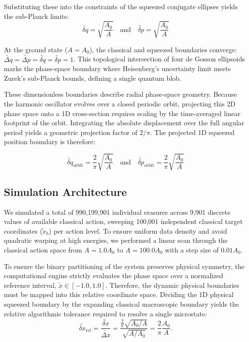 \documentclass[%
  aps, reprint, prl, amsmath,amssymb
]{revtex4-2}
\begin{document}
Substituting these into the constraints of the squeezed conjugate ellipses yields the sub-Planck limits:
\begin{equation}
\widetilde{\delta q} = \sqrt{\frac{A_0}{A}} \quad \text{and} \quad \widetilde{\delta p} = \sqrt{\frac{A_0}{A}}
\end{equation}

At the ground state ($A = A_0$), the classical and squeezed boundaries converge: $\widetilde{\Delta q} = \widetilde{\Delta p} = \widetilde{\delta q} = \widetilde{\delta p} = 1$. This topological intersection of four de Gosson ellipsoids marks the phase-space boundary where Heisenberg's uncertainty limit meets Zurek's sub-Planck bounds, defining a single quantum blob.

These dimensionless boundaries describe radial phase-space geometry. Because the harmonic oscillator evolves over a closed periodic orbit, projecting this 2D phase space onto a 1D cross-section requires scaling by the time-averaged linear footprint of the orbit. Integrating the absolute displacement over the full angular period yields a geometric projection factor of $2/\pi$. The projected 1D squeezed position boundary is therefore:

\begin{equation}
\widetilde{\delta q}_{\text{orbit}} = \frac{2}{\pi} \sqrt{\frac{A_0}{A}}
\quad \text{and} \quad
\widetilde{\delta p}_{\text{orbit}} = \frac{2}{\pi} \sqrt{\frac{A_0}{A}}
\end{equation}

\subsection{Simulation Architecture}

We simulated a total of 990,199,901 individual erasures across 9,901 discrete values of available classical action, sweeping 100,001 independent classical target coordinates ($\tilde{x}_b$) per action level. To ensure uniform data density and avoid quadratic warping at high energies, we performed a linear scan through the classical action space from $A = 1.0 A_0$ to $A = 100.0 A_0$ with a step size of $0.01 A_0$.

To ensure the binary partitioning of the system preserves physical symmetry, the computational engine strictly evaluates the phase space over a normalized reference interval, $\tilde{x} \in [-1.0, 1.0]$. Therefore, the dynamic physical boundaries must be mapped into this relative coordinate space. Dividing the 1D physical squeezed boundary by the expanding classical macroscopic boundary yields the relative algorithmic tolerance required to resolve a single microstate:
\begin{equation}
\widetilde{\delta x}_{\text{rel}} = \frac{\widetilde{\delta x}}{\widetilde{\Delta x}} = \frac{\frac{2}{\pi}\sqrt{A_0/A}}{\sqrt{A/A_0}} = \frac{2}{\pi} \frac{A_0}{A}.
\end{equation}
 
\end{document}

